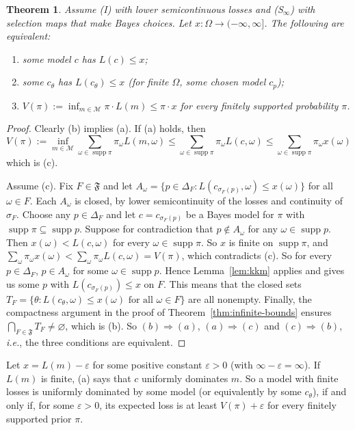 \documentclass[11pt]{article}
\newtheorem{theorem}{Theorem}[section]
\theoremstyle{definition}
\theoremstyle{remark}
\newcommand{\M}{\mathcal M}
\newcommand{\F}{\mathfrak F}
\newcommand{\supp}{\operatorname{supp}}
\begin{document}
\begin{theorem}\label{thm:margin}
Assume (I) with lower semicontinuous losses and (S$_\infty$) with selection maps that make Bayes choices. Let $x:\Omega\to(-\infty,\infty]$. The following are equivalent:
\begin{enumerate}[label=(\alph*)]
\item some model $c$ has $L(c)\le x$;
\item some $c_\theta$ has $L(c_\theta)\le x$ (for finite $\Omega$, some chosen model $c_p$);
\item $V(\pi):=\inf_{m\in\M}\pi\cdot L(m)\le\pi\cdot x$ for every finitely supported probability $\pi$.
\end{enumerate}
\end{theorem}
\begin{proof}
Clearly (b) implies (a). If (a) holds, then
\[
V(\pi):=\inf_{m\in\M}\sum_{\omega\in\supp\pi}\pi_\omega L(m,\omega)\le\sum_{\omega\in\supp\pi}\pi_\omega L(c,\omega)\le\sum_{\omega\in\supp\pi}\pi_\omega x(\omega)
\]
which is (c).

Assume (c). Fix $F\in\F$ and let $A_\omega=\{p\in\Delta_F:L(c_{\sigma_F(p)},\omega)\le x(\omega)\}$ for all $\omega\in F$. Each $A_\omega$ is closed, by lower semicontinuity of the losses and continuity of $\sigma_F$. Choose any $p\in\Delta_F$ and let $c=c_{\sigma_F(p)}$ be a Bayes model for $\pi$ with $\supp\pi\subseteq\supp p$. Suppose for contradiction that $p\not\in A_\omega$ for any $\omega\in\supp p$. Then $x(\omega)<L(c,\omega)$ for every $\omega\in\supp\pi$. So $x$ is finite on $\supp\pi$, and $\sum_\omega\pi_\omega x(\omega)<\sum_\omega\pi_\omega L(c,\omega)=V(\pi)$, which contradicts (c). So for every $p\in\Delta_F$, $p\in A_\omega$ for some $\omega\in\supp p$. Hence Lemma~\ref{lem:kkm} applies and gives us some $p$ with $L(c_{\sigma_F(p)})\le x$ on $F$. This means that the closed sets $T_F=\{\theta:L(c_\theta,\omega)\le x(\omega)\text{ for all }\omega\in F\}$ are all nonempty. Finally, the compactness argument in the proof of Theorem~\ref{thm:infinite-bounds} ensures $\bigcap_{F\in\F}T_F\neq \varnothing$, which is (b). So $(b)\Rightarrow (a)$, $(a)\Rightarrow (c)$ and $(c)\Rightarrow (b)$, \textit{i.e.}, the three conditions are equivalent.
\end{proof}




Let $x=L(m)-\varepsilon$ for some positive constant $\varepsilon>0$ (with $\infty-\varepsilon=\infty$). If $L(m)$ is finite, (a) says that $c$ uniformly dominates $m$. So a model with finite losses is uniformly dominated by some model (or equivalently by some $c_\theta$), if and only if, for some $\varepsilon>0$, its expected loss is at least $V(\pi)+\varepsilon$ for every finitely supported prior $\pi$.
\end{document}
